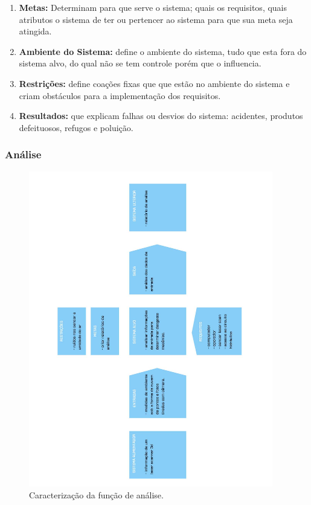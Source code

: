 \documentclass[12pt,a4paper]{article}
\begin{document}
\begin{enumerate}
	\item \textbf {Metas:} Determinam para que serve o sistema; quais os
	requisitos, quais atributos o sistema de ter ou pertencer ao sistema para que sua meta seja atingida.
	\item \textbf {Ambiente do Sistema:} define o ambiente do sistema, tudo que
	esta fora do sistema alvo, do qual não se tem controle porém que o influencia.
	\item \textbf {Restrições:} define coações fixas que que estão no ambiente do
	sistema e criam obstáculos para a implementação dos requisitos.
	\item \textbf {Resultados:} que explicam falhas ou desvios do sistema:
	acidentes, produtos defeituosos, refugos e poluição.
\end{enumerate}

\subsubsection {Análise}

\begin{figure}[H]
\begin{center}
  \includegraphics[width=0.95\textwidth]{figs/caracterizacao_analise.jpg}
  \caption{Caracterização da função de análise.}
  \label{fig:caracterizacao_analise}
\end{center}
\end{figure} 
\end{document}
